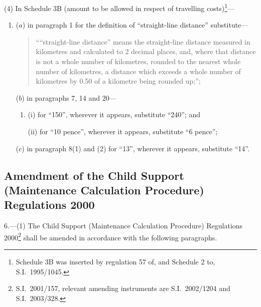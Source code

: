 \documentclass[12pt,a4paper]{article}
\begin{document}
(4) In Schedule 3B (amount to be allowed in respect of travelling costs)\footnote{Schedule 3B was inserted by regulation 57 of, and Schedule 2 to, S.I.\ 1995/1045.}—
\begin{enumerate}\item[]
($a$) in paragraph 1 for the definition of “straight-line distance” substitute—
\begin{quotation}
““straight-line distance” means the straight-line distance measured in kilometres and calculated to 2 decimal places, and, where that distance is not a whole number of kilometres, rounded to the nearest whole number of kilometres, a distance which exceeds a whole number of kilometres by 0$.$50 of a kilometre being rounded up;”;
\end{quotation}

($b$) in paragraphs 7, 14 and 20—
\begin{enumerate}\item[]
(i) for “150”, wherever it appears, substitute “240”; and

(ii) for “10 pence”, wherever it appears, substitute “6 pence”;
\end{enumerate}

($c$) in paragraph 8(1) and (2) for “13”, wherever it appears, substitute “14”.
\end{enumerate}

\subsection[6. Amendment of the Child Support (Maintenance Calculation Procedure) Regulations 2000]{Amendment of the Child Support (Maintenance Calculation Procedure) Regulations 2000}

6.---(1)  The Child Support (Maintenance Calculation Procedure) Regulations 2000\footnote{S.I.\ 2001/157, relevant amending instruments are S.I.\ 2002/1204 and S.I.\ 2003/328.} shall be amended in accordance with the following paragraphs.
\end{document}

